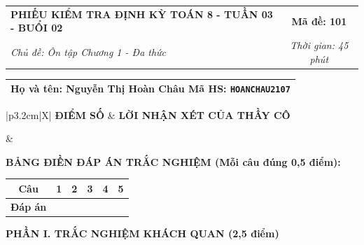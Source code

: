 \documentclass[12pt,a4paper]{article}
\begin{document}
\newpage



\noindent
\begin{tabularx}{\linewidth}{|X|c|}
\hline
\textbf{PHIẾU KIỂM TRA ĐỊNH KỲ TOÁN 8 - TUẦN 03 - BUỔI 02} & \textbf{Mã đề: 101} \\
\textit{Chủ đề: Ôn tập Chương 1 - Đa thức} & \textit{Thời gian: 45 phút} \\
\hline
\end{tabularx}

\vspace{1mm}

\noindent
\begin{tabularx}{\linewidth}{|X|}
\hline
\rule[-2mm]{0pt}{7.5mm}\textbf{Họ và tên:} \textbf{\large Nguyễn Thị Hoàn Châu} \hfill \textbf{Mã HS:} \texttt{HOANCHAU2107} \quad \\
\hline
\end{tabularx}

\vspace{1mm}

\noindent
\begin{tabularx}{\linewidth}{|p{3.2cm}|X|}
\hline
\centering\textbf{ĐIỂM SỐ} & \centering\textbf{LỜI NHẬN XÉT CỦA THẦY CÔ} \tabularnewline
\hline
\rule{0pt}{1.3cm} & \tabularnewline
\hline
\end{tabularx}

\vspace{1.2mm}

\noindent\textbf{BẢNG ĐIỀN ĐÁP ÁN TRẮC NGHIỆM (Mỗi câu đúng 0,5 điểm):}
\vspace{0.8mm}

\noindent
\renewcommand{\arraystretch}{1.35}
\begin{tabularx}{\linewidth}{|c|*{5}{>{\centering\arraybackslash}X|}}
\hline
\textbf{Câu} & \textbf{1} & \textbf{2} & \textbf{3} & \textbf{4} & \textbf{5} \\
\hline
\textbf{Đáp án} & & & & & \\
\hline
\end{tabularx}
\renewcommand{\arraystretch}{1.0}

\vspace{1.5mm}

\noindent\textbf{\large PHẦN I. TRẮC NGHIỆM KHÁCH QUAN (2,5 điểm)}
\vspace{1mm}
\end{document}
